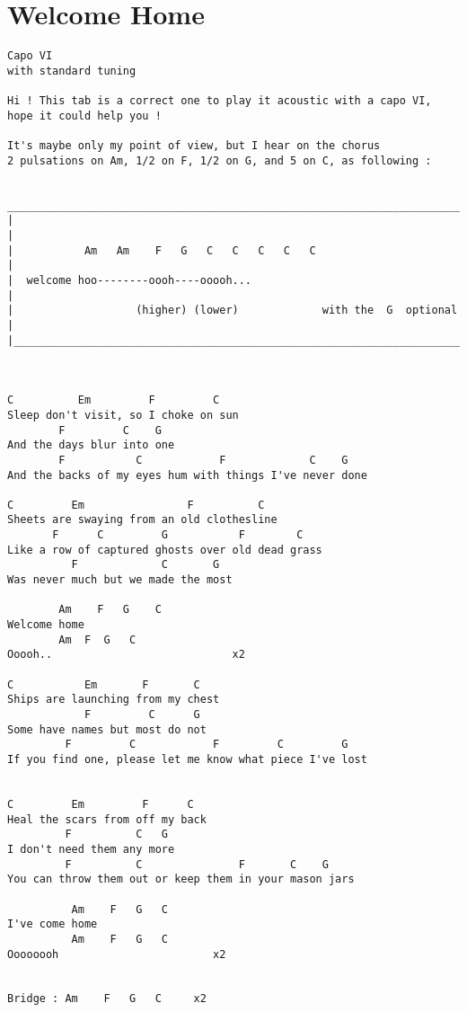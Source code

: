 \documentclass[leqno]{memoir}
\begin{document}
\chapter{Welcome Home}
\begin{verbatim}
Capo VI
with standard tuning

Hi ! This tab is a correct one to play it acoustic with a capo VI, hope it could help you !

It's maybe only my point of view, but I hear on the chorus 
2 pulsations on Am, 1/2 on F, 1/2 on G, and 5 on C, as following :

 _________________________________________________________________________
|                                                                         |
|           Am   Am    F   G   C   C   C   C   C                          |
|  welcome hoo--------oooh----ooooh...                                    |
|                   (higher) (lower)             with the  G  optional    |
|_________________________________________________________________________|



C          Em         F         C         
Sleep don't visit, so I choke on sun
        F         C    G
And the days blur into one
        F           C            F             C    G
And the backs of my eyes hum with things I've never done

C         Em                F          C  
Sheets are swaying from an old clothesline
       F      C         G           F        C
Like a row of captured ghosts over old dead grass
          F             C       G
Was never much but we made the most

        Am    F   G    C       
Welcome home
        Am  F  G   C       
Ooooh..                            x2

C           Em       F       C
Ships are launching from my chest
            F         C      G 
Some have names but most do not
         F         C            F         C         G
If you find one, please let me know what piece I've lost


C         Em         F      C
Heal the scars from off my back
         F          C   G
I don't need them any more
         F          C               F       C    G
You can throw them out or keep them in your mason jars

          Am    F   G   C      
I've come home
          Am    F   G   C
Oooooooh                        x2


Bridge : Am    F   G   C     x2


\end{verbatim}
\end{document}

